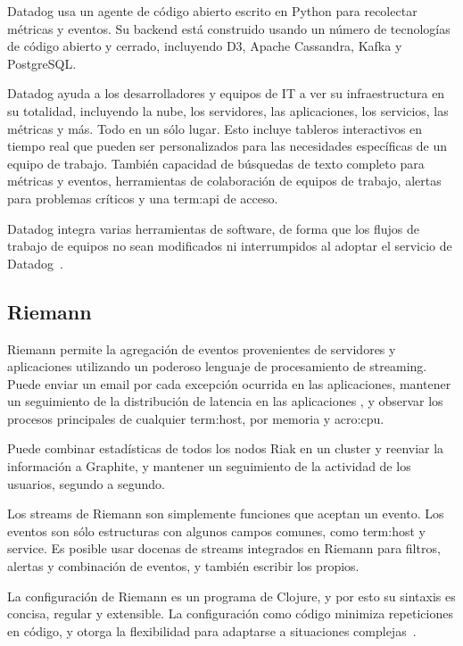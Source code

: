 Datadog usa un agente de código abierto escrito en Python para recolectar
métricas y eventos. Su backend está construido usando un número de tecnologías
de código abierto y cerrado, incluyendo D3, Apache Cassandra, Kafka y
PostgreSQL.

Datadog ayuda a los desarrolladores y equipos de IT a ver su infraestructura en
su totalidad, incluyendo la nube, los servidores, las aplicaciones, los
servicios, las métricas y más. Todo en un sólo lugar. Esto incluye tableros
interactivos en tiempo real que pueden ser personalizados para las necesidades
específicas de un equipo de trabajo. También capacidad de búsquedas de texto
completo para métricas y eventos, herramientas de colaboración de equipos de
trabajo, alertas para problemas críticos y una \gls{term:api} de acceso.

Datadog integra varias herramientas de software, de forma que los flujos de
trabajo de equipos no sean modificados ni interrumpidos al adoptar el servicio
de Datadog~\cite{datadog}.

\subsection{Riemann}

Riemann permite la agregación de eventos provenientes de servidores y
aplicaciones utilizando un poderoso lenguaje de procesamiento de streaming.
Puede enviar un email por cada excepción ocurrida en las aplicaciones, mantener
un seguimiento de la distribución de latencia en las aplicaciones , y
observar los procesos principales de cualquier \gls{term:host}, por memoria y
\gls{acro:cpu}.

Puede combinar estadísticas de todos los nodos Riak en un cluster y reenviar la
información a Graphite, y mantener un seguimiento de la actividad de los
usuarios, segundo a segundo.

Los streams de Riemann son simplemente funciones que aceptan un evento. Los
eventos son sólo estructuras con algunos campos comunes, como \gls{term:host} y
service. Es posible usar docenas de streams integrados en Riemann para
filtros, alertas y combinación de eventos, y también escribir los propios.

La configuración de Riemann es un programa de Clojure, y por esto su sintaxis
es concisa, regular y extensible. La configuración como código minimiza
repeticiones en código, y otorga la flexibilidad para adaptarse a situaciones
complejas~\cite{riemann}.
